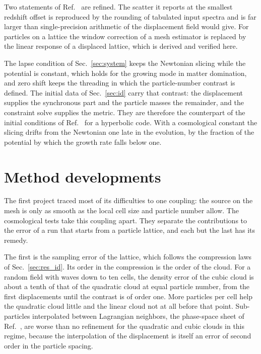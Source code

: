 \documentclass[aps,prd,twocolumn,10pt,superscriptaddress,nofootinbib,longbibliography,floatfix]{revtex4-2}
\begin{document}
Two statements of Ref.~\cite{Barrera-Hinojosa:2020arz} are refined. The scatter it reports at the smallest redshift offset is reproduced by the rounding of tabulated input spectra and is far larger than single-precision arithmetic of the displacement field would give. For particles on a lattice the window correction of a mesh estimator is replaced by the linear response of a displaced lattice, which is derived and verified here.

The lapse condition of Sec.~\ref{sec:system} keeps the Newtonian slicing while the potential is constant, which holds for the growing mode in matter domination, and zero shift keeps the threading in which the particle-number contrast is defined. The initial data of Sec.~\ref{sec:id} carry that contrast: the displacement supplies the synchronous part and the particle masses the remainder, and the constraint solve supplies the metric. They are therefore the counterpart of the initial conditions of Ref.~\cite{Barrera-Hinojosa:2020arz} for a hyperbolic code. With a cosmological constant the slicing drifts from the Newtonian one late in the evolution, by the fraction of the potential by which the growth rate falls below one.

\section{Method developments}\label{sec:tracks}

The first project traced most of its difficulties to one coupling: the source on the mesh is only as smooth as the local cell size and particle number allow. The cosmological tests take this coupling apart. They separate the contributions to the error of a run that starts from a particle lattice, and each but the last has its remedy.

The first is the sampling error of the lattice, which follows the compression laws of Sec.~\ref{sec:res_id}. Its order in the compression is the order of the cloud. For a random field with waves down to ten cells, the density error of the cubic cloud is about a tenth of that of the quadratic cloud at equal particle number, from the first displacements until the contrast is of order one. More particles per cell help the quadratic cloud little and the linear cloud not at all before that point. Sub-particles interpolated between Lagrangian neighbors, the phase-space sheet of Ref.~\cite{Abel:2011ui}, are worse than no refinement for the quadratic and cubic clouds in this regime, because the interpolation of the displacement is itself an error of second order in the particle spacing.
\end{document}

